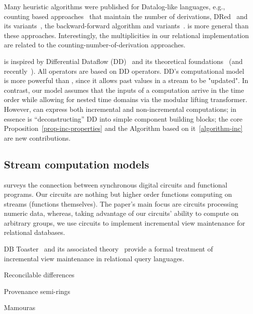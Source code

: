 Many heuristic algorithms were published for Datalog-like languages, e.g., 
counting based approaches~\cite{Dewan-iis92,motik-aaai15} that maintain the number of derivations,
DRed~\cite{gupta-sigmod93} and its variants~\cite{Ceri-VLDB91,Wolfson-sigmod91,%
Staudt-vldb96,Kotowski-rr11,Lu-sigmod95,Apt-sigmod87}, the backward-forward algorithm and variants~\cite{motik-aaai15,
Harrison-wdd92,motik-ai19}.  \dbsp is more general than these approaches.  
Interestingly, the \zrs multiplicities in our relational implementation 
are related to the counting-number-of-derivation approaches.

\dbsp is inspired by Differential Dataflow (DD)~\cite{mcsherry-cidr13, murray-sosp13}
and its theoretical foundations~\cite{abadi-fossacs15} (and recently~\cite{mchserry-vldb20,chothia-vldb16}).
All \dbsp operators are based on DD operators.  DD's computational model is more powerful than
\dbsp, since it allows past values in a stream to be "updated".
In contrast, our model assumes that the inputs of a computation arrive in the time order while allowing 
for nested time domains via the modular lifting transformer.  However, \dbsp can express both
incremental and non-incremental computations; in essence \dbsp is ``deconstructing'' DD into 
simple component building blocks; the core Proposition~\ref{prop-inc-properties} and
the Algorithm based on it~\ref{algorithm-inc} are new contributions.

\subsection{Stream computation models}

\cite{gammie-acs13} surveys the connection between synchronous digital circuits and functional programs.
Our circuits are nothing but higher order functions computing on streams (functions themselves).
The paper's main focus are circuits processing numeric data, whereas, taking advantage of our circuits'
ability to compute on arbitrary groups, we use circuits to implement incremental view maintenance for
relational databases.

DB Toaster~\cite{ahmad-vldb09} and its associated theory~\cite{koch-pods10, koch-pods16}
provide a formal treatment of incremental view maintenance in relational query languages.

Reconcilable differences~\cite{green-tcs11}

Provenance semi-rings~\cite{green-pods07}

Mamouras~\cite{mamouras-esop20}  

